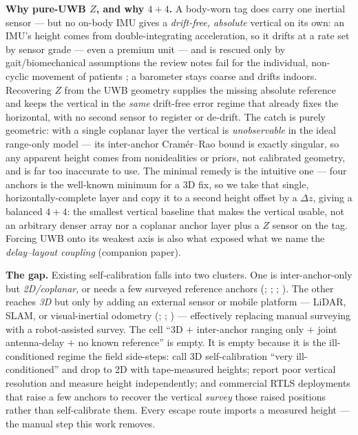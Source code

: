 \documentclass[10pt,a4paper]{article}
\begin{document}
\textbf{Why pure-UWB $Z$, and why $4{+}4$.} A body-worn tag does carry one inertial sensor --- but no
on-body IMU gives a \emph{drift-free, absolute} vertical on its own: an IMU's height comes from
double-integrating acceleration, so it drifts
at a rate set by sensor grade --- even a premium unit --- and is rescued only by gait/biomechanical
assumptions the review notes fail for the individual, non-cyclic movement of patients
\citep{yogesh_2023}; a barometer stays coarse and drifts indoors. Recovering $Z$ from the UWB geometry
supplies the missing absolute reference and keeps the vertical in the \emph{same} drift-free error
regime that already fixes the horizontal, with no second sensor to register or de-drift. The catch is purely
geometric: with a single coplanar layer the vertical is \emph{unobservable} in the ideal range-only
model --- its inter-anchor Cram\'{e}r--Rao bound is exactly singular, so any apparent height comes from
nonidealities or priors, not calibrated geometry, and is far too inaccurate to use. The minimal remedy is the intuitive one --- four anchors is
the well-known minimum for a 3D fix, so we take that single, horizontally-complete layer and copy it to
a second height offset by a $\Delta z$, giving a balanced $4{+}4$: the smallest vertical baseline that
makes the vertical usable, not an arbitrary denser array nor a coplanar anchor layer plus a $Z$ sensor on the tag. Forcing
UWB onto its weakest axis is also what exposed what we name the \emph{delay--layout coupling}
(companion paper).

\textbf{The gap.} Existing self-calibration falls into two clusters. One is inter-anchor-only but
\emph{2D/coplanar}, or needs a few surveyed reference anchors
(\citealp{de_preter_2019}; \citealp{piavanini_2022}; \citealp{corbalan_2023};
\citealp{ridolfi_2021}). The other reaches \emph{3D} but only by adding an external sensor or mobile
platform --- LiDAR, SLAM, or visual-inertial odometry (\citealp{nguyen_2025}; \citealp{yuan_2024};
\citealp{delama_2025}) --- effectively replacing manual surveying with a robot-assisted survey. The
cell ``3D $+$ inter-anchor ranging only $+$ joint antenna-delay $+$ no known reference'' is empty.
It is empty because it is the ill-conditioned regime the field side-steps: \citet{de_preter_2019}
call 3D self-calibration ``very ill-conditioned'' and drop to 2D with tape-measured heights;
\citet{corbalan_2023} report poor vertical resolution and measure height independently; and commercial
RTLS deployments that raise a few anchors to recover the vertical \emph{survey} those raised positions
rather than self-calibrate them. Every escape route imports a measured height --- the manual step this
work removes.
\end{document}
